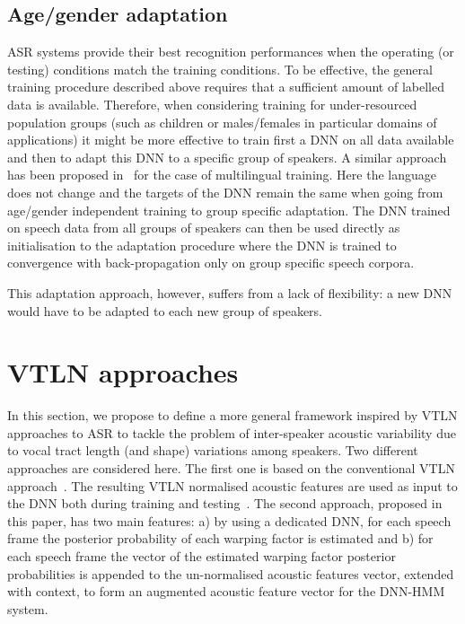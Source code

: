 \documentclass{nle}
\begin{document}
\subsection{Age/gender adaptation}
ASR  systems  provide their  best  recognition  performances when  the
operating  (or testing)  conditions match   the training
conditions.  To be effective, the general training procedure described
above requires that a sufficient  amount of labelled data is available.
Therefore,  when considering  training  for under-resourced  population groups
(such  as   children  or   males/females  in  particular   domains  of
applications) it  might be more  effective to train  first a DNN  on all
data available and then to adapt this DNN to a specific group of speakers. 
A similar approach has been proposed in~\citet{thomas13} for  the  case of  multilingual training.
Here the language  does not change and the targets of the DNN remain
the same when going from age/gender independent training to group
  specific adaptation.  The DNN trained on speech data from all groups
  of  speakers can  then be  used  directly as  initialisation to  the
  adaptation  procedure where  the DNN  is trained  to convergence
  with back-propagation only on group specific speech corpora.
  
This adaptation approach, however, suffers from a lack of flexibility: 
a new DNN would have to be adapted to each new group of speakers.
  
\section{VTLN approaches}\label{section:VTLN}
In this section, we propose to define a more general framework inspired by VTLN approaches to ASR to tackle the problem of inter-speaker acoustic variability due to
vocal tract  length (and shape)  variations among speakers. Two different approaches are considered here. The  first  one  is  based  on  the
conventional   VTLN  approach~\citep{EidGis96,LeeRos96,WegMcaOrlPek96}.
The resulting VTLN  normalised acoustic features are used  as input to
the  DNN both during  training and  testing~\citep{seide11}.  The
second approach, proposed in this  paper, has two main features: a) by
using a dedicated DNN, for each speech frame the posterior probability
of each warping  factor is estimated and b) for  each speech frame the
vector  of the  estimated  warping factor  posterior probabilities  is
appended to  the un-normalised acoustic features  vector, extended with
context, to form an augmented  acoustic feature vector for the DNN-HMM
system.
\end{document}
